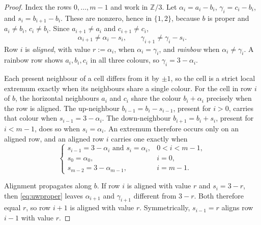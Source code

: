 \documentclass[11pt]{article}
\theoremstyle{definition}
\theoremstyle{remark}
\newcommand{\Z}{\mathbb{Z}}
\begin{document}
\begin{proof}
Index the rows $0,\dots,m-1$ and work in $\Z/3$. Let $\alpha_i=a_i-b_i$,
$\gamma_i=c_i-b_i$, and $s_i=b_{i+1}-b_i$. These are nonzero, hence in $\{1,2\}$,
because $b$ is proper and $a_i\ne b_i$, $c_i\ne b_i$. Since $a_{i+1}\ne a_i$ and
$c_{i+1}\ne c_i$,
\begin{equation}\label{eq:uwproper}
  \alpha_{i+1}\ne\alpha_i-s_i,\qquad \gamma_{i+1}\ne\gamma_i-s_i.
\end{equation}
Row $i$ is \emph{aligned}, with value $r:=\alpha_i$, when $\alpha_i=\gamma_i$, and
\emph{rainbow} when $\alpha_i\ne\gamma_i$. A rainbow row shows $a_i,b_i,c_i$ in all
three colours, so $\gamma_i=3-\alpha_i$.

\medskip\noindent
Each present neighbour of a cell differs from it by $\pm1$, so the cell is a strict
local extremum exactly when its neighbours share a single colour. For the cell in
row $i$ of $b$, the horizontal neighbours $a_i$ and $c_i$ share the colour
$b_i+\alpha_i$ precisely when the row is aligned. The up-neighbour
$b_{i-1}=b_i-s_{i-1}$, present for $i>0$, carries that colour when
$s_{i-1}=3-\alpha_i$. The down-neighbour $b_{i+1}=b_i+s_i$, present for $i<m-1$,
does so when $s_i=\alpha_i$. An extremum therefore occurs only on an aligned row,
and an aligned row $i$ carries one exactly when
\begin{equation}\label{eq:extremum}
  \begin{cases}
    s_{i-1}=3-\alpha_i \text{ and } s_i=\alpha_i, & 0<i<m-1,\\
    s_0=\alpha_0, & i=0,\\
    s_{m-2}=3-\alpha_{m-1}, & i=m-1.
  \end{cases}
\end{equation}

\medskip\noindent
Alignment propagates along $b$. If row $i$ is aligned with value $r$ and
$s_i=3-r$, then \eqref{eq:uwproper} leaves $\alpha_{i+1}$ and $\gamma_{i+1}$
different from $3-r$. Both therefore equal $r$, so row $i+1$ is aligned with value
$r$. Symmetrically, $s_{i-1}=r$ aligns row $i-1$ with value $r$.


\end{proof}
\end{document}
